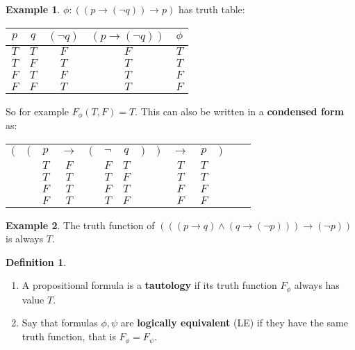 \documentclass{article}
\newcommand{\rb}[1]{\left( #1 \right)}
\newcommand{\notb}[1]{\rb{\neg #1}}
\newcommand{\andb}[2]{\rb{#1 \land #2}}
\newcommand{\impb}[2]{\rb{#1 \rightarrow #2}}
\theoremstyle{definition}\newtheorem{definition}{Definition}[subsection]
\theoremstyle{definition}\newtheorem{remark}[definition]{Remark}
\theoremstyle{definition}\newtheorem*{example}{Example}
\theoremstyle{definition}\newtheorem*{note}{Note}
\begin{document}
\begin{example}
$ \phi : \impb{\impb{p}{\notb{q}}}{p} $ has truth table:
\begin{center}
\begin{tabular}{|c|c|c|c|c|}
\hline
$ p $ & $ q $ & $ \notb{q} $ & $ \impb{p}{\notb{q}} $ & $ \phi $ \\
\hline
$ T $ & $ T $ & $ F $ & $ F $ & $ T $ \\
\hline
$ T $ & $ F $ & $ T $ & $ T $ & $ T $ \\
\hline
$ F $ & $ T $ & $ F $ & $ T $ & $ F $ \\
\hline
$ F $ & $ F $ & $ T $ & $ T $ & $ F $ \\
\hline
\end{tabular}
\end{center}
So for example $ F_\phi\rb{T, F} = T $. This can also be written in a \textbf{condensed form} as:
\begin{center}
\begin{tabular}{c c c c c c c c c c c c c c}
$ ( $ & $ ( $ & $ p $ & $ \rightarrow $ & $ ( $ & $ \neg $ & $ q $ & $ ) $ & $ ) $ & $ \rightarrow $ & $ p $ & $ ) $ \\
& & $ T $ & $ F $ & & $ F $ & $ T $ & & & $ T $ & $ T $ & \\
& & $ T $ & $ T $ & & $ T $ & $ F $ & & & $ T $ & $ T $ & \\
& & $ F $ & $ T $ & & $ F $ & $ T $ & & & $ F $ & $ F $ & \\
& & $ F $ & $ T $ & & $ T $ & $ F $ & & & $ F $ & $ F $ & \\
\end{tabular}
\end{center}
\end{example}


\begin{example}
The truth function of $ \impb{\andb{\impb{p}{q}}{\impb{q}{\notb{p}}}}{\notb{p}} $ is always $ T $.
\end{example}

\begin{definition}
\hfill
\begin{enumerate}
\item A propositional formula is a \textbf{tautology} if its truth function $ F_\phi $ always has value $ T $.
\item Say that formulas $ \phi, \psi $ are \textbf{logically equivalent} (LE) if they have the same truth function, that is $ F_\phi = F_\psi $.
\end{enumerate}
\end{definition}
\end{document}
